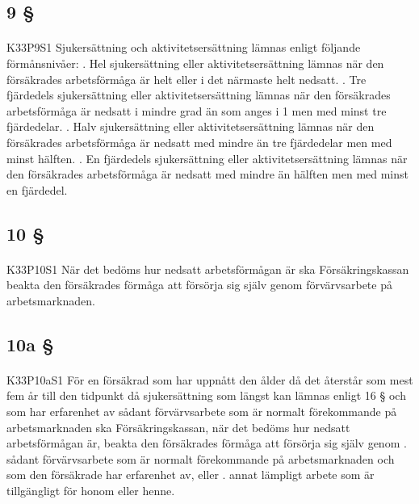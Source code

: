 \documentclass[a4paper,notitlepage,openany,10pt]{book}
\begin{document}
\subsection*{9 §}
\paragraph*{}
{\tiny K33P9S1}
Sjukersättning och aktivitetsersättning lämnas enligt följande förmånsnivåer:
. Hel sjukersättning eller aktivitetsersättning lämnas när den försäkrades arbetsförmåga är helt eller i det närmaste helt nedsatt.
. Tre fjärdedels sjukersättning eller aktivitetsersättning lämnas när den försäkrades arbetsförmåga är nedsatt i mindre grad än som anges i 1 men med minst tre fjärdedelar.
. Halv sjukersättning eller aktivitetsersättning lämnas när den försäkrades arbetsförmåga är nedsatt med mindre än tre fjärdedelar men med minst hälften.
. En fjärdedels sjukersättning eller aktivitetsersättning lämnas när den försäkrades arbetsförmåga är nedsatt med mindre än hälften men med minst en fjärdedel.
\subsection*{10 §}
\paragraph*{}
{\tiny K33P10S1}
När det bedöms hur nedsatt arbetsförmågan är ska Försäkringskassan beakta den försäkrades förmåga att försörja sig själv genom förvärvsarbete på arbetsmarknaden.
\subsection*{10a §}
\paragraph*{}
{\tiny K33P10aS1}
För en försäkrad som har uppnått den ålder då det återstår som mest fem år till den tidpunkt då sjukersättning som längst kan lämnas enligt 16 § och som har erfarenhet av sådant förvärvsarbete som är normalt förekommande på arbetsmarknaden ska Försäkringskassan, när det bedöms hur nedsatt arbetsförmågan är, beakta den försäkrades förmåga att försörja sig själv genom
. sådant förvärvsarbete som är normalt förekommande på arbetsmarknaden och som den försäkrade har erfarenhet av, eller
. annat lämpligt arbete som är tillgängligt för honom eller henne.
\end{document}
